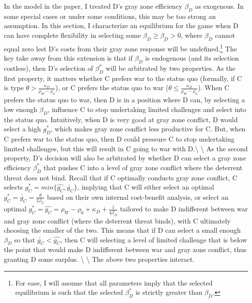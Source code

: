 \documentclass[
]{article}
\begin{document}
In the model in the paper, I treated D's gray zone efficiency
\(\beta_{D}\) as exogenous. In some special cases or under some
conditions, this may be too strong an assumption. In this section, I
characterize an equilibrium for the game when D can have complete
flexibility in selecting some \(\beta_{D}\geq\underline{\beta_{D}}>0\),
where \(\beta_{D}\) cannot equal zero lest D's costs from their gray
zone response will be
undefined.\footnote{For ease, I will assume that all parameters imply that the selected equilibrium is such that the selected $\beta_{D}^{*}$ is strictly greater than $\underline{\beta_{D}}$.}
The key take away from this extension is that if \(\beta_{D}\) is
endogenous (and its selection costless), then D's selection of
\(\beta_{D}^{*}\) will be arbitrated by two properties. As the first
property, it matters whether C prefers war to the status quo (formally,
if C is type \(\theta>\frac{\kappa_{D}}{\rho_{W}-\rho_{0}}\)), or C
prefers the status quo to war
(\(\theta\leq\frac{\kappa_{D}}{\rho_{W}-\rho_{0}}\)). When C prefers the
status quo to war, then D is in a position where D can, by selecting a
low enough \(\beta_{D}\), influence C to stop undertaking limited
challenges and select into the status quo. Intuitively, when D is very
good at gray zone conflict, D would select a high \(g_{D}^{*}\), which
makes gray zone conflict less productive for C. But, when C prefers war
to the status quo, then D could pressure C to stop undertaking limited
challenges, but this will result in C going to war with
D.\textbackslash{} \textbackslash{} As the second property, D's decision
will also be arbitrated by whether D can select a gray zone efficiency
\(\beta_{D}^{*}\) that pushes C into a level of gray zone conflict where
the deterrent threat does not bind. Recall that if C optimally conducts
gray zone conflict, C selects
\(g_{C}^{*}=min\{\hat{g_{C}},\check{g_{C}}\}\), implying that C will
either select an optimal
\(g_{C}^{*}=\check{g_{C}}=\frac{\theta}{2\beta_{C}}\) based on their own
internal cost-benefit analysis, or select an optimal
\(g_{C}^{*}=\hat{g_{C}}=\rho_{W}-\rho_{0}+\kappa_{D}+\frac{1}{4\beta_{D}}\)
tailored to make D indifferent between war and gray zone conflict (where
the deterrent threat binds), with C ultimately choosing the smaller of
the two. This means that if D can select a small enough \(\beta_{D}\) so
that \(\check{g_{C}}<\hat{g_{C}}\), then C will selecting a level of
limited challenge that is below the point that would make D indifferent
between war and gray zone conflict, thus granting D some surplus.
\textbackslash{} \textbackslash{} The above two properties interact.
\end{document}

